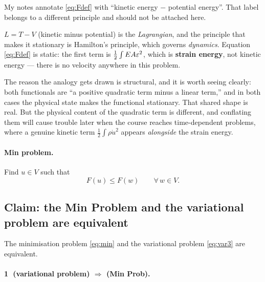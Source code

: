 \begin{pitfall}
My notes annotate \eqref{eq:Fdef} with ``kinetic energy $-$ potential energy''.
That label belongs to a different principle and should not be attached here.

$L = T - V$ (kinetic minus potential) is the \emph{Lagrangian}, and the
principle that makes it stationary is Hamilton's principle, which governs
\emph{dynamics}. Equation \eqref{eq:Fdef} is static: the first term is
$\tfrac12\int EA\varepsilon^{2}$, which is \textbf{strain energy}, not kinetic energy
--- there is no velocity anywhere in this problem.

The reason the analogy gets drawn is structural, and it is worth seeing
clearly: both functionals are ``a positive quadratic term minus a linear
term,'' and in both cases the physical state makes the functional stationary.
That shared shape is real. But the physical content of the quadratic term is
different, and conflating them will cause trouble later when the course reaches
time-dependent problems, where a genuine kinetic term $\tfrac12\int\rho\dot u^2$
appears \emph{alongside} the strain energy.
\end{pitfall}

\paragraph{Min problem.} Find $u\in V$ such that
\begin{equation}\label{eq:min}
  F(u) \le F(w) \qquad \forall\, w\in V .
\end{equation}

\subsection*{Claim: the Min Problem and the variational problem are equivalent}

\begin{theorem}\label{thm:equiv}
The minimisation problem \eqref{eq:min} and the variational problem
\eqref{eq:var3} are equivalent.
\end{theorem}

\paragraph{\textcircled{\scriptsize1} (variational problem) $\Rightarrow$ (Min Prob).}


